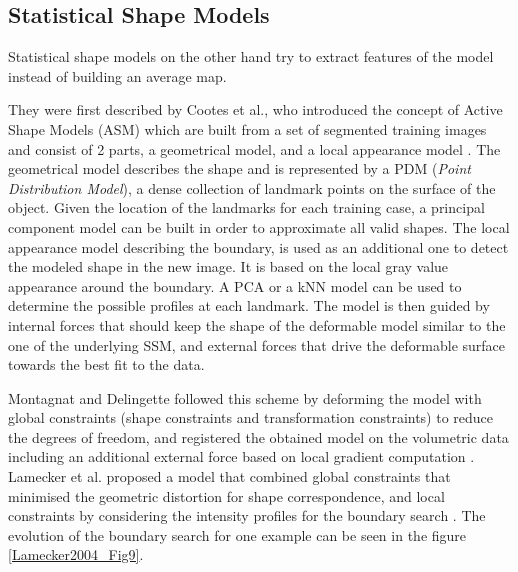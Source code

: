 \documentclass[]{article}
\begin{document}
	\subsection*{Statistical Shape Models}
	
	Statistical shape models on the other hand try to extract features of
	the model instead of building an average map.
	
	They were first described by Cootes et al., who introduced the concept of Active Shape Models (ASM) which
	are built from a set of segmented training images and consist of 2
	parts, a geometrical model, and a local appearance model \cite{Cootes1995}. The
	geometrical model describes the shape and is represented by a PDM
	(\emph{Point Distribution Model}), a dense collection of landmark points
	on the surface of the object. Given the location of the landmarks for
	each training case, a principal component model can be built in order to
	approximate all valid shapes. The local appearance model describing the
	boundary, is used as an additional one to detect the modeled shape in
	the new image. It is based on the local gray value appearance around the
	boundary. A PCA or a kNN model can be used to determine the possible
	profiles at each landmark. The model is then guided by internal
	forces that should keep the shape of the deformable model similar to the
	one of the underlying SSM, and external forces that drive the deformable
	surface towards the best fit to the data.
	
	Montagnat and Delingette followed this scheme by deforming the model with
	global constraints (shape constraints and transformation constraints) to
	reduce the degrees of freedom, and registered the obtained model on the
	volumetric data including an additional external force based on local
	gradient computation \cite{Montagnat1997}.
	Lamecker et al. proposed a model that combined global constraints that
	minimised the geometric distortion for shape correspondence, and local
	constraints by considering the intensity profiles for the boundary
	search \cite{Lamecker2004}. The evolution of the boundary search for one example can be seen in the figure \ref{Lamecker2004_Fig9}.
	
\end{document}
